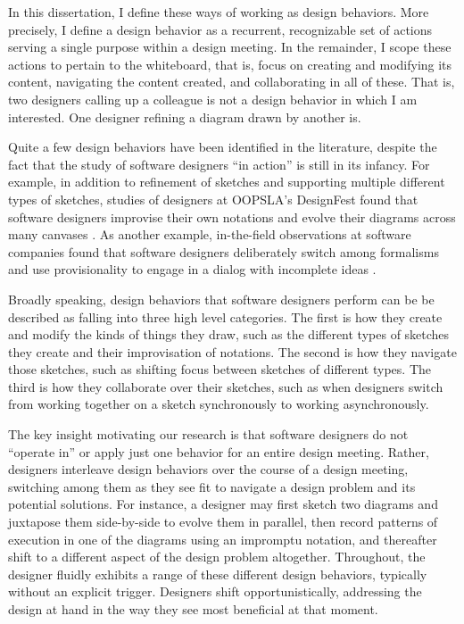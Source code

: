 In this dissertation, I define these ways of working as design behaviors. More precisely, I define a design behavior as a recurrent, recognizable set of actions serving a single purpose within a design meeting. In the remainder, I scope these actions to pertain to the whiteboard, that is, focus on creating and modifying its content, navigating the content created, and collaborating in all of these. That is, two designers calling up a colleague is not a design behavior in which I am interested.  One designer refining a diagram drawn by another is.

Quite a few design behaviors have been identified in the literature, despite the fact that the study of software designers ``in action'' is still in its infancy. For example, in addition to refinement of sketches and supporting multiple different types of sketches, studies of designers at OOPSLA’s DesignFest found that software designers improvise their own notations and evolve their diagrams across many canvases \cite{dekel2007notation}. As another example, in-the-field observations at software companies found that software designers deliberately switch among formalisms and use provisionality to engage in a dialog with incomplete ideas \cite{petre2009insights}. 

Broadly speaking, design behaviors that software designers perform can be be described as falling into three high level categories. The  first is how they create and modify the kinds of things they draw, such as the different types of sketches they create and their improvisation of notations. The second is how they navigate those sketches, such as shifting focus between sketches of different types. The third is how they collaborate over their sketches, such as when designers switch from working together on a sketch synchronously to working asynchronously. 

The key insight motivating our research is that software designers do not ``operate in'' or apply just one behavior for an entire design meeting. Rather, designers interleave design behaviors over the course of a design meeting, switching among them as they see fit to navigate a design problem and its potential solutions. For instance, a designer may first sketch two diagrams and juxtapose them side-by-side to evolve them in parallel, then record patterns of execution in one of the diagrams using an impromptu notation, and thereafter shift to a different aspect of the design problem altogether. Throughout, the designer fluidly exhibits a range of these different design behaviors, typically without an explicit trigger. Designers shift opportunistically, addressing the design at hand in the way they see most beneficial at that moment.

